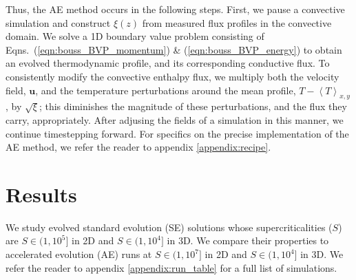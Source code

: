 \documentclass[aps, pre, onecolumn, nofootinbib, notitlepage, groupedaddress, amsfonts, amssymb, amsmath, longbibliography]{revtex4-1}
\newcommand{\angles}[1]{\ensuremath{\left\langle #1 \right\rangle}}
\begin{document}
Thus, the AE method occurs in the following steps. First, we pause a convective simulation and
construct $\xi(z)$ from measured flux profiles in the convective domain.
We solve a 1D boundary value problem consisting of
Eqns.~(\ref{eqn:bouss_BVP_momentum}) \& (\ref{eqn:bouss_BVP_energy})
to obtain an evolved thermodynamic profile, and its corresponding conductive flux.
To consistently modify the convective enthalpy flux, we multiply both the velocity field,
$\bm{u}$, and the temperature perturbations around the mean profile, $T - \angles{T}_{x,y}$,
by $\sqrt{\xi}$; this diminishes the magnitude of these perturbations, and the
flux they carry, appropriately.
After adjusing the fields of a simulation in this manner, we continue timestepping forward.
For specifics on the precise implementation of the AE method, we refer
the reader to appendix \ref{appendix:recipe}.


\section{Results}
\label{sec:results}
We study evolved standard evolution (SE) solutions whose supercriticalities ($S$) are 
$S \in (1, 10^5]$ in 2D and $S \in (1, 10^4]$ in
3D. We compare their properties to
accelerated evolution (AE) runs at $S \in (1, 10^7]$ in 2D and
$S \in (1, 10^4]$ in 3D.
We refer the reader to appendix \ref{appendix:run_table} for a full list of
simulations.
\end{document}
